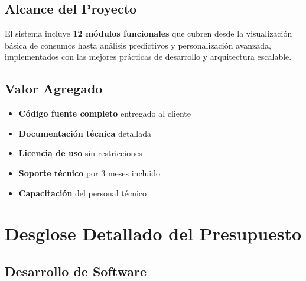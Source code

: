 \documentclass[12pt,a4paper]{article}
\begin{document}
\subsection{Alcance del Proyecto}

El sistema incluye \textbf{12 módulos funcionales} que cubren desde la visualización básica de consumos hasta análisis predictivos y personalización avanzada, implementados con las mejores prácticas de desarrollo y arquitectura escalable.

\subsection{Valor Agregado}

\begin{itemize}
    \item \textbf{Código fuente completo} entregado al cliente
    \item \textbf{Documentación técnica} detallada
    \item \textbf{Licencia de uso} sin restricciones
    \item \textbf{Soporte técnico} por 3 meses incluido
    \item \textbf{Capacitación} del personal técnico
\end{itemize}

\section{Desglose Detallado del Presupuesto}

\subsection{Desarrollo de Software}
\end{document}
